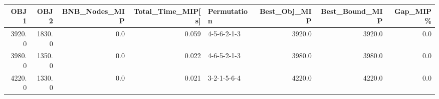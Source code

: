 \begin{tabular}{rrrrlrrr}
\toprule
   OBJ1 &    OBJ2 &  BNB\_Nodes\_MIP &  Total\_Time\_MIP[s] &  Permutation &  Best\_Obj\_MIP &  Best\_Bound\_MIP &  Gap\_MIP\% \\
\midrule
 3920.0 &  1830.0 &            0.0 &              0.059 &  4-5-6-2-1-3 &        3920.0 &          3920.0 &       0.0 \\
 3980.0 &  1350.0 &            0.0 &              0.022 &  4-6-5-2-1-3 &        3980.0 &          3980.0 &       0.0 \\
 4220.0 &  1330.0 &            0.0 &              0.021 &  3-2-1-5-6-4 &        4220.0 &          4220.0 &       0.0 \\
\bottomrule
\end{tabular}
